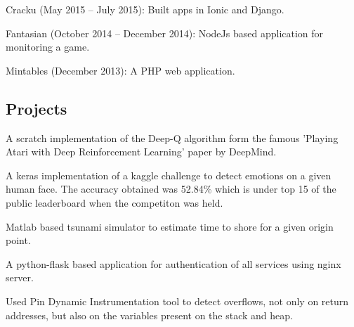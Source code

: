 \documentclass[letterpaper]{deedy-resume} %
\begin{document}
\begin{minipage}[t]{0.66\textwidth}
\sectionspace %


\begin{tightitemize}
\item Cracku (May 2015 – July 2015): Built apps in Ionic and Django.
\item Fantasian (October 2014 – December 2014): NodeJs based application for monitoring a game.
\item Mintables (December 2013): A PHP web application.
\end{tightitemize}

\vspace{\topsep} %
\subsection{Projects}
\vspace{\topsep} %
\begin{tightitemize}
\item {} A scratch implementation of the Deep-Q algorithm form the famous 'Playing Atari with Deep Reinforcement Learning' paper by DeepMind.
\item {} A keras implementation of a kaggle challenge to detect emotions on a given human face. The accuracy obtained was 52.84\% which is under top 15 of the public leaderboard when the competiton was held.
\item {} Matlab based tsunami simulator to estimate time to shore for a given origin point.
\item {} A python-flask based application for authentication of all services using nginx server.
\item {} Used Pin Dynamic Instrumentation tool to detect overflows, not only on return addresses, but also on the variables present on the stack and heap.
\item {}
\end{tightitemize}


\end{minipage}
\end{document}
